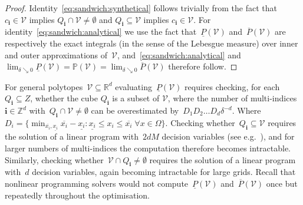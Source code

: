 \documentclass[letterpaper, 10pt, conference]{ieeeconf} %
\providecommand{\bfa}[1]{\mathbf{#1}}
\begin{document}
%
\begin{proof}
Identity~\eqref{eq:sandwich:synthetical} follows trivially from the fact that~$c_\bfa{i}\in\mathcal V$ implies $Q_\bfa{i}\cap\mathcal V\neq\emptyset$ and $Q_\bfa{i}\subseteq\mathcal V$ implies $c_\bfa{i}\in\mathcal V$.
%
For identity~\eqref{eq:sandwich:analytical} we use the fact that~$\underline P(\mathcal V)$ and~$\overline{P}(\mathcal V)$ are respectively the exact integrals (in the sense of the Lebesgue measure) over inner and outer approximations of~$\mathcal V$, and~\eqref{eq:sandwich:analytical} and~$\lim_{\delta\searrow0}\underline{P}(\mathcal V)=\mathbb{P}(\mathcal V)=\lim_{\delta\searrow0}\overline{P}(\mathcal V)$ therefore follow.
\end{proof}
%
For general polytopes~$\mathcal V\subseteq\mathbb R^d$ evaluating~$\underline{P}(\mathcal V)$ requires checking, for each $Q_{\bfa i} \subseteq Z$, whether the cube $Q_{\bfa i}$ is a subset of $\mathcal{V}$, where the number of multi-indices~$\bfa{i}\in\mathbb Z^d$ with~$Q_\bfa{i}\cap\mathcal V\neq\emptyset$ can be overestimated by~$D_1D_2\dots D_d \delta^{-d}$.
%
Where $D_i = \{\min_{\overline{x_i},\underline{x_i}} \overline{x_i}-\underline{x_i} : \underline{x_i}\leq x_i\leq\overline{x_i}\; \forall x\in\Omega\}$.
%
Checking whether~$Q_\bfa{i}\subseteq\mathcal V$ requires the solution of a linear program with~$2dM$ decision variables (see e.g.~\cite{Schaich:thesis}), and for larger numbers of multi-indices the computation therefore becomes intractable.
%
Similarly, checking whether~$\mathcal V\cap Q_\bfa{i}\neq\emptyset$ requires the solution of a linear program with~$d$ decision variables, again becoming intractable for large grids.
%
Recall that nonlinear programming solvers would not compute~$\underline{P}(\mathcal V)$ and~$\overline{P}(\mathcal V)$ once but repeatedly throughout the optimisation.
%
\end{document}
